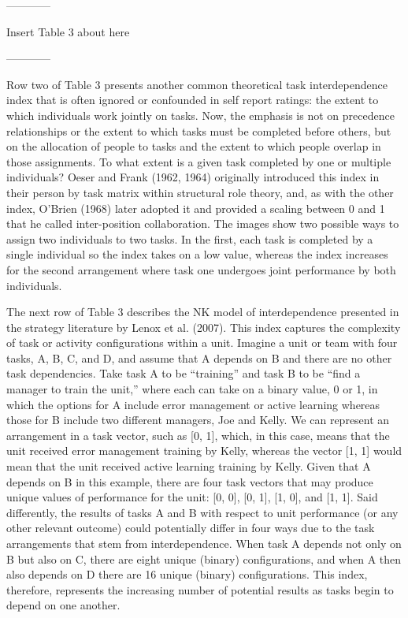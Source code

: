 \documentclass[english,,man]{apa6}
\theoremstyle{definition}
\theoremstyle{definition}
\theoremstyle{definition}
\theoremstyle{remark}
\begin{document}
\begin{center}

------------

Insert Table 3 about here

------------

\end{center}

Row two of Table 3 presents another common theoretical task
interdependence index that is often ignored or confounded in self report
ratings: the extent to which individuals work jointly on tasks. Now, the
emphasis is not on precedence relationships or the extent to which tasks
must be completed before others, but on the allocation of people to
tasks and the extent to which people overlap in those assignments. To
what extent is a given task completed by one or multiple individuals?
Oeser and Frank (1962, 1964) originally introduced this index in their
person by task matrix within structural role theory, and, as with the
other index, O'Brien (1968) later adopted it and provided a scaling
between 0 and 1 that he called inter-position collaboration. The images
show two possible ways to assign two individuals to two tasks. In the
first, each task is completed by a single individual so the index takes
on a low value, whereas the index increases for the second arrangement
where task one undergoes joint performance by both individuals.

The next row of Table 3 describes the NK model of interdependence
presented in the strategy literature by Lenox et al. (2007). This index
captures the complexity of task or activity configurations within a
unit. Imagine a unit or team with four tasks, A, B, C, and D, and assume
that A depends on B and there are no other task dependencies. Take task
A to be \enquote{training} and task B to be \enquote{find a manager to
train the unit,} where each can take on a binary value, 0 or 1, in which
the options for A include error management or active learning whereas
those for B include two different managers, Joe and Kelly. We can
represent an arrangement in a task vector, such as {[}0, 1{]}, which, in
this case, means that the unit received error management training by
Kelly, whereas the vector {[}1, 1{]} would mean that the unit received
active learning training by Kelly. Given that A depends on B in this
example, there are four task vectors that may produce unique values of
performance for the unit: {[}0, 0{]}, {[}0, 1{]}, {[}1, 0{]}, and {[}1,
1{]}. Said differently, the results of tasks A and B with respect to
unit performance (or any other relevant outcome) could potentially
differ in four ways due to the task arrangements that stem from
interdependence. When task A depends not only on B but also on C, there
are eight unique (binary) configurations, and when A then also depends
on D there are 16 unique (binary) configurations. This index, therefore,
represents the increasing number of potential results as tasks begin to
depend on one another.
\end{document}
